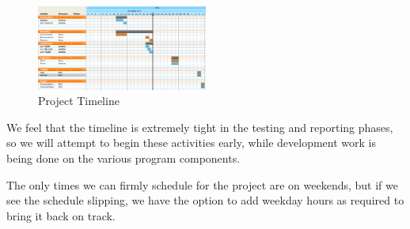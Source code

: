 \documentclass[titlepage]{article}
\begin{document}
\begin{figure}[htb]                                                                       
  \begin{center}
    \includegraphics[width=0.5\textwidth]{imgs/timeline.png}
  \end{center}
  \caption{Project Timeline}
  \label{fig:timeline}
\end{figure}

We feel that the timeline is extremely tight in the testing and reporting phases, so we will attempt to begin these activities early, while development work is being done on the various
program components.

The only times we can firmly schedule for the project are on weekends, but if we see the schedule slipping, we have the option to add weekday hours as required to bring it back on
track.
\end{document}
